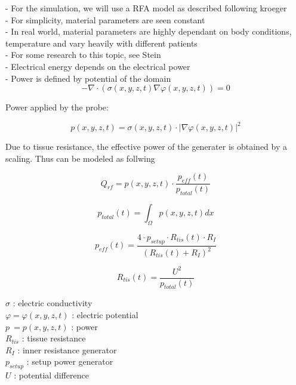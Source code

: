 \documentclass[parskip=half, titlepage=yes, 12pt, BCOR=12mm, DIV=calc]{scrartcl}
\begin{document}
- For the simulation, we will use a RFA model as described following kroeger \\
- For simplicity, material parameters are seen constant \\
- In real world, material parameters are highly dependant on body conditions, temperature and vary heavily with different patients \\
- For some research to this topic, see Stein \\

- Electrical energy depends on the electrical power \\
- Power is defined by potential of the domain \\

\begin{equation}
    - \nabla \cdot (\sigma(x,y,z,t) \nabla \varphi(x,y,z,t)) = 0
\end{equation}

Power applied by the probe:

\begin{equation}
    p(x,y,z,t) = \sigma(x,y,z,t) \cdot |\nabla \varphi(x,y,z,t)|^2
\end{equation}

Due to tissue resistance, the effective power of the generater is obtained by a scaling. Thus can be modeled as follwing   

\begin{equation}
    Q_{rf} = p(x,y,z,t) \cdot \frac{p_{eff}(t)}{p_{total}(t)} 
\end{equation}

\begin{equation}
    p_{total}(t) = \int_{\Omega} p(x,y,z,t) dx
\end{equation}

\begin{equation}
    p_{eff}(t) = \frac{4 \cdot p_{setup} \cdot R_{tis}(t) \cdot R_I}{(R_{tis}(t) + R_I)^2}
\end{equation}

\begin{equation}
    R_{tis}(t) = \frac{U^2}{p_{total}(t)}
\end{equation}

$\sigma$ : electric conductivity \\
$\varphi = \varphi(x,y,z,t)$ : electric potential \\
$p \: = p(x,y,z,t)$  : power \\


$R_{tis}$ : tissue resistance \\
$R_I$ : inner resistance generator \\
$p_{setup}$ : setup power generator \\
$U$ : potential difference\\
\end{document}
